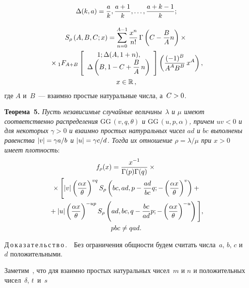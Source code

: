 \begin{multicols}{2}
\noindent
$$
\Delta(k,a)=\displaystyle\frac{\displaystyle a\mathstrut}{\displaystyle k\mathstrut},\displaystyle\frac{\displaystyle a+1\mathstrut}{\displaystyle k\mathstrut},\ldots,\displaystyle\frac{\displaystyle a+k-1\mathstrut}{\displaystyle k\mathstrut};
$$

\vspace*{-12pt}

\noindent
\begin{multline}
S_{\rho}\left(A,B,C;x\right)=\sum\limits_{n=0}^{A-1}\fr{x^n}{n!}\,
\Gamma\left(C - \fr{B}{A}n \right)\times{} \\
{}\times{}_1F_{A+B}\left[\begin{array}{c}
1; \Delta(A,1+n),\\
\Delta\left(B, 1 - C + \fr{B}{A}\,n \right)
\end{array}\right]\left(
\fr{(-1)^B}{A^A B^B}\, x^A
\right), \\ 
x\in\mathbb{R}\,,
\label{S_GGF}
\end{multline}
где $A$ и~$B$~--- взаимно простые натуральные числа, а~$C\hm>0$.

\smallskip

\noindent
\textbf{Теорема~5.}
\textit{Пусть независимые случайные величины~$\lambda$ и $\mu$ имеют соответственно распределения 
$\mathrm{GG}\,(v,q,\theta)$ и $\mathrm{GG}\,(u,p,\alpha)$, причем  $uv<0$ и для некоторых $\gamma>0$ и взаимно простых 
натуральных чисел $ad$ и $bc$ выполнены равенства $|v| \hm= \gamma a/b$ и $|u| \hm= \gamma c/d$. 
Тогда их отношение $\rho=\lambda/\mu$ при $x>0$ имеет плотность}:
\begin{multline*} 
f_\rho(x) =  \displaystyle\frac{\displaystyle x^{-1}\mathstrut}{\displaystyle \Gamma(p)\Gamma(q)\mathstrut} \times{}\\
{}\times
\Bigg[ |v|\left(\displaystyle\frac{\displaystyle \alpha x\mathstrut}{\displaystyle \theta\mathstrut}\right)^{vq}S_{\rho}\left(
bc,ad,p-\displaystyle\frac{\displaystyle ad\mathstrut}{\displaystyle bc\mathstrut}q;-\left( \displaystyle\frac{\displaystyle \alpha x\mathstrut}{\displaystyle \theta\mathstrut} \right)^v\right)  +{}\\
 {}+  |u|\left(\displaystyle\frac{\displaystyle \alpha x\mathstrut}{\displaystyle \theta\mathstrut}\right)^{-up}S_{\rho}\left(
ad,bc,q-\displaystyle\frac{\displaystyle bc\mathstrut}{\displaystyle ad\mathstrut}p;-\left( \displaystyle\frac{\displaystyle \alpha x\mathstrut}{\displaystyle \theta\mathstrut} \right)^{-u}\right)\Bigg], \\
pbc \neq qad.
\end{multline*}


\noindent
Д\,о\,к\,а\,з\,а\,т\,е\,л\,ь\,с\,т\,в\,о\,.\ \
 Без ограничения общности будем считать числа~$a$, $b$, $c$ и~$d$ положительными.

Заметим~\cite{Prudnikov1}, что для взаимно простых натуральных чисел~$m$ и $n$ и положительных 
чисел~$\delta$, $t$~и~$s$


\end{multicols}
